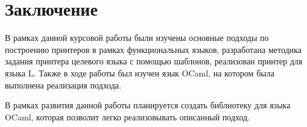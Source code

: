 \section{Заключение}

В рамках данной курсовой работы были изучены основные подходы по построению принтеров в рамках функциональных языков, разработана методика задания принтера целевого языка с помощью шаблонов, реализован принтер для языка L. Также в ходе работы был изучен язык OCaml, на котором была выполнена реализация подхода.

В рамках развития данной работы планируется создать библиотеку для языка OCaml, которая позволит легко реализовывать описанный подход.